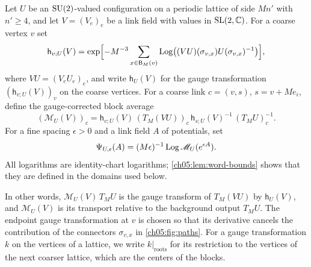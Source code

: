 \begin{definition}\label{ch05:def:corrected-step}
Let $U$ be an $\mathrm{SU}(2)$-valued configuration on a periodic lattice of side $Mn'$ with $n'\ge4$, and let $V=(V_e)_e$ be a link field with values in $\mathrm{SL}(2,\mathbb C)$. For a coarse vertex $v$ set
\[
 \mathsf h_{v;U}(V)=\exp\Bigl[-M^{-3}\sum_{x\in\mathsf B_M(v)}\operatorname{Log}\bigl((VU)(\sigma_{v,x})U(\sigma_{v,x})^{-1}\bigr)\Bigr],
\]
where $VU=(V_eU_e)_e$, and write $\mathsf h_U(V)$ for the gauge transformation $(\mathsf h_{v;U}(V))_v$ on the coarse vertices. For a coarse link $c=(v,s)$, $s=v+Me_i$, define the gauge-corrected block average
\[
 (\mathscr M_U(V))_c=\mathsf h_{v;U}(V)\,(T_M(VU))_c\,\mathsf h_{s;U}(V)^{-1}\,(T_MU)_c^{-1}.
\]
For a fine spacing $\epsilon>0$ and a link field $A$ of potentials, set
\[
 \Psi_{U,\epsilon}(A)=(M\epsilon)^{-1}\operatorname{Log}\mathscr M_U(e^{\epsilon A}).
\]
All logarithms are identity-chart logarithms; \cref{ch05:lem:word-bounds} shows that they are defined in the domains used below.
\end{definition}

In other words, $\mathscr M_U(V)\,T_MU$ is the gauge transform of $T_M(VU)$ by $\mathsf h_U(V)$, and $\mathscr M_U(V)$ is its transport relative to the background output $T_MU$. The endpoint gauge transformation at $v$ is chosen so that its derivative cancels the contribution of the connectors $\sigma_{v,x}$ in \cref{ch05:fig:paths}. For a gauge transformation $k$ on the vertices of a lattice, we write $k|_{\mathrm{roots}}$ for its restriction to the vertices of the next coarser lattice, which are the centers of the blocks.

